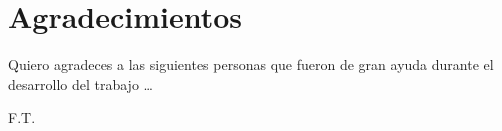 \section*{Agradecimientos}
Quiero agradeces a las siguientes personas que fueron de gran ayuda durante el desarrollo del trabajo \ldots


\begin{flushright}
F.T.\\[1pc]
\end{flushright}